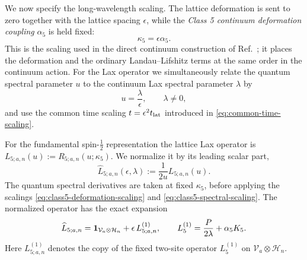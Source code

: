 We now specify the long-wavelength scaling.  The lattice deformation is sent
to zero together with the lattice spacing $\epsilon$, while the
\emph{Class 5 continuum deformation coupling} $\alpha_5$ is held fixed:
\begin{equation}
\kappa_5=\epsilon\alpha_5.
\label{eq:class5-deformation-scaling}
\end{equation}
This is the scaling used in the direct continuum construction of
Ref.~\cite{deLeeuwFontanellaNietoGarcia2026}; it places the deformation and
the ordinary Landau--Lifshitz terms at the same order in the continuum
action.  For the Lax operator we simultaneously relate the quantum spectral
parameter $u$ to the continuum Lax spectral parameter $\lambda$ by
\begin{equation}
u=\frac{\lambda}{\epsilon},
\qquad \lambda\neq0,
\label{eq:class5-spectral-scaling}
\end{equation}
and use the common time scaling $t=\epsilon^2t_{\rm lat}$ introduced in
\eqref{eq:common-time-scaling}.

For the fundamental spin-$\tfrac12$ representation the lattice Lax operator
is $L_{5;a,n}(u):=R_{5;a,n}(u;\kappa_5)$.  We normalize it by its leading scalar
part,
\begin{equation}
\widehat L_{5;a,n}(\epsilon,\lambda)
:=
\frac{1}{2u}L_{5;a,n}(u).
\label{eq:class5-normalized-L}
\end{equation}
The quantum spectral derivatives are taken at fixed $\kappa_5$, before
applying the scalings \eqref{eq:class5-deformation-scaling} and
\eqref{eq:class5-spectral-scaling}.  The normalized operator has the exact
expansion
\begin{equation}
\widehat L_{5;a,n}
=
\mathbf{1}_{\mathcal V_a\otimes\mathcal H_n}
+\epsilon\,L^{(1)}_{5;a,n},
\qquad
L^{(1)}_5
=
\frac{P}{2\lambda}+\alpha_5 K_5.
\label{eq:class5-L-expansion}
\end{equation}
Here $L^{(1)}_{5;a,n}$ denotes the copy of the fixed two-site operator $L^{(1)}_5$
on $\mathcal V_a\otimes\mathcal H_n$.

